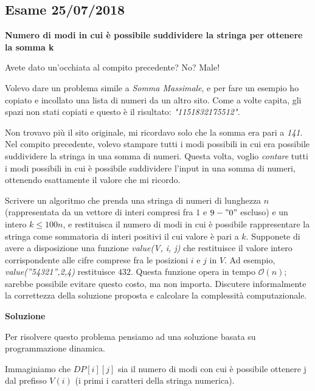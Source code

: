 \documentclass[../cheatSheetAlgoritmi.tex]{subfiles}
\begin{document}
\subsection{Esame 25/07/2018}
\textbf{Numero di modi in cui è possibile suddividere la stringa per ottenere la somma k} 

Avete dato un'occhiata al compito precedente? No? Male! 

Volevo dare un problema simile a \emph{Somma Massimale}, e per fare un esempio ho copiato e incollato una lista di numeri da un altro sito. 
Come a volte capita, gli spazi non stati copiati e questo è il risultato: \emph{"1151832175512"}.  

Non trovavo più il sito originale, mi ricordavo solo che la somma era pari a \emph{141}. Nel compito precedente, volevo stampare tutti i modi possibili in cui era possibile suddividere la stringa in una somma di numeri. Questa volta, voglio \emph{contare} tutti i modi possibili in cui è possibile suddividere l'input in una somma di numeri, ottenendo esattamente il valore che mi ricordo. 

Scrivere un algoritmo che prenda una stringa di numeri di lunghezza $n$ (rappresentata da un vettore di interi compresi fra $1$ e $9 - "0"$ escluso) e un intero $k \leq 100n$, e restituisca il numero di modi in cui è possibile rappresentare la stringa come sommatoria di interi positivi il cui valore è pari a $k$. Supponete di avere a disposizione una funzione \emph{value(V, i, j)} che  restituisce  il  valore  intero  corrispondente  alle  cifre comprese  fra  le  posizioni $i$ e $j$ in $V$. Ad  esempio, \emph{value(”54321”,2,4)} restituisce $432$.  
Questa funzione opera in tempo $\mathcal{O}(n)$; sarebbe possibile evitare questo costo, ma non importa. Discutere informalmente la correttezza della soluzione proposta e calcolare la complessità computazionale. 

\textbf{Soluzione} 

Per risolvere questo problema pensiamo ad una soluzione basata su programmazione dinamica. 

Immaginiamo che $DP[i][j]$ sia il numero di modi con cui è possibile ottenere j dal prefisso $V(i)$ (i primi i caratteri della stringa numerica). 
\end{document}
